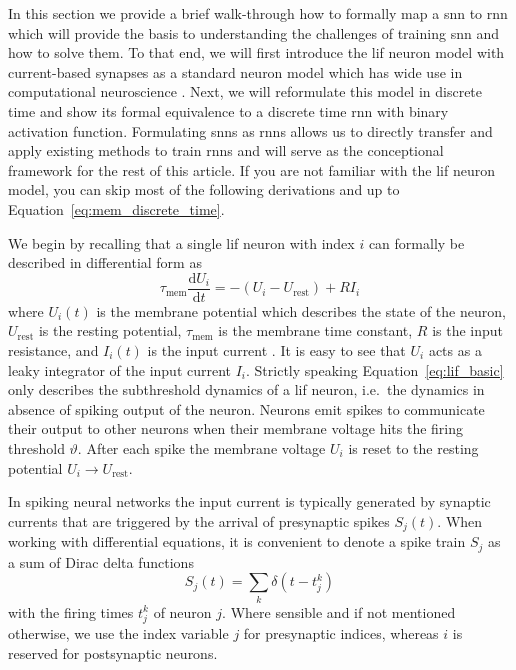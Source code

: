 \documentclass[journal,onecolumn,11pt]{IEEEtran}
\begin{document}
In this section we provide a brief walk-through how to formally map a \gls{snn} to \gls{rnn} 
which will provide the basis to understanding the challenges of training \gls{snn} and how to solve them.
To that end, we will first introduce the \gls{lif} neuron model
with current-based synapses as a standard neuron model which has wide use in computational neuroscience \cite{Gerstner_etal14_neurdyna}. 
Next, we will reformulate this model in discrete time and show its formal equivalence to a discrete time \gls{rnn} with binary activation function. 
Formulating \glspl{snn} as \glspl{rnn} 
allows us to directly transfer and apply existing methods to train \glspl{rnn} and will serve as the conceptional framework for the rest of this article. 
If you are not familiar with the \gls{lif} neuron model, you can skip most of the following derivations and up to Equation~\eqref{eq:mem_discrete_time}. 

We begin by recalling that a single \gls{lif} neuron with index $i$ 
can formally be described in differential form as
\begin{equation}
    \tau_\mathrm{mem} \frac{\mathrm{d}U_i}{\mathrm{d}t} = -(U_i-U_\mathrm{rest}) + RI_i
    \label{eq:lif_basic}
\end{equation}
where $U_i(t)$ is the membrane potential which describes the state of the
neuron, $U_\mathrm{rest}$ is the resting potential, $\tau_\mathrm{mem}$ is the
membrane time constant, $R$ is the input resistance, and $I_i(t)$ is the 
input current \cite{Gerstner_etal14_neurdyna}.
It is easy to see that $U_i$ acts as a leaky integrator of the input current
$I_i$.
Strictly speaking Equation~\eqref{eq:lif_basic} only describes the subthreshold dynamics of a \gls{lif} neuron, i.e.\ the dynamics in absence of spiking output of the neuron.
Neurons emit spikes to communicate their output to other neurons when their membrane voltage hits the firing threshold $\vartheta$.
After each spike the membrane voltage $U_i$ is reset to the resting 
potential $U_i\rightarrow U_\mathrm{rest}$.

In spiking neural networks the input current is typically generated by synaptic
currents that are triggered by the arrival of presynaptic spikes $S_j(t)$.  When
working with differential equations, it is convenient to denote a spike train
$S_j$ as a sum of Dirac delta functions
$$S_j(t)=\sum_k \delta(t-t_j^k)$$
with the firing times $t_j^k$ of neuron $j$.
Where sensible and if not mentioned otherwise, we use the index variable $j$ for
presynaptic indices, whereas $i$ is reserved for postsynaptic neurons.
\end{document}
